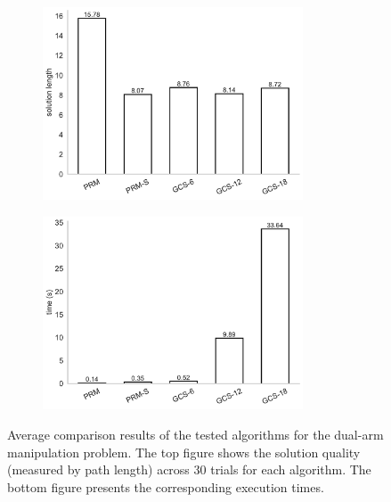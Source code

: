 \begin{figure}[!t]
    \centering
    \begin{subfigure}[b]{\linewidth}
        \centering
        \includegraphics[width=0.85\textwidth]{figures/solution_length_barplot.pdf}
        \captionsetup{justification=centering}
        \label{subfig:}
    \end{subfigure}
    \begin{subfigure}[b]{\linewidth}
        \centering
        \includegraphics[width=0.85\textwidth]{figures/time_barplot.pdf}
        \captionsetup{justification=centering}
        \label{subfig:}
    \end{subfigure}
    \caption{Average comparison results of the tested algorithms for the dual-arm manipulation problem. The top figure shows the solution quality (measured by path length) across 30 trials for each algorithm. The bottom figure presents the corresponding execution times.}
    \label{fig:exp-b}
\end{figure}

